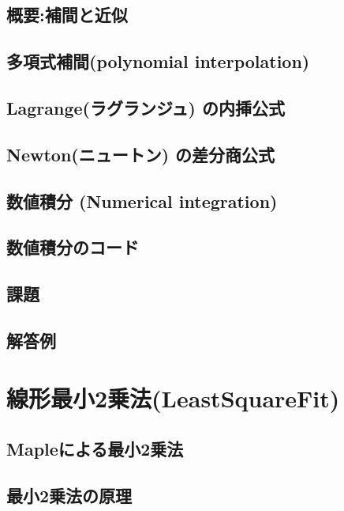 \documentclass[10pt,a4j]{jsbook}
\begin{document}
\section{概要:補間と近似}
 
\section{多項式補間(polynomial interpolation)}
 
\section{Lagrange(ラグランジュ) の内挿公式}
 
\section{Newton(ニュートン) の差分商公式}
 
\section{数値積分 (Numerical integration)}
 
\section{数値積分のコード}
 
\section{課題}
 
\section{解答例}
 

\chapter{線形最小2乗法(LeastSquareFit)}
\section{Mapleによる最小2乗法}
 
\section{最小2乗法の原理}

\end{document}
